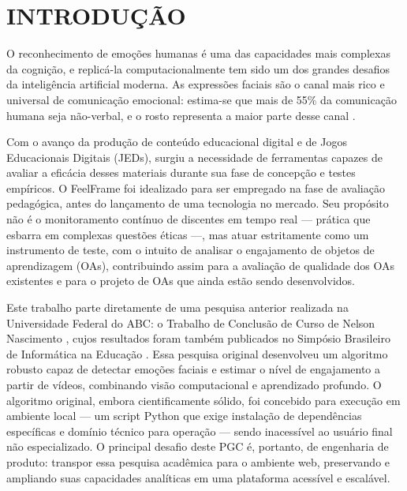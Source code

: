 \documentclass[
	12pt,
	openright,
	oneside,
	a4paper,
	english,
	brazil
	]{abntex2}
\begin{document}
\listoffigures*
\cleardoublepage

\listoftables*
\cleardoublepage

\tableofcontents*
\cleardoublepage

\textual

\chapter{INTRODUÇÃO}

O reconhecimento de emoções humanas é uma das capacidades mais complexas da cognição, e replicá-la computacionalmente tem sido um dos grandes desafios da inteligência artificial moderna. As expressões faciais são o canal mais rico e universal de comunicação emocional: estima-se que mais de 55\% da comunicação humana seja não-verbal, e o rosto representa a maior parte desse canal \cite{mehrabian1971silent}.

Com o avanço da produção de conteúdo educacional digital e de Jogos Educacionais Digitais (JEDs), surgiu a necessidade de ferramentas capazes de avaliar a eficácia desses materiais durante sua fase de concepção e testes empíricos. O FeelFrame foi idealizado para ser empregado na fase de avaliação pedagógica, antes do lançamento de uma tecnologia no mercado. Seu propósito não é o monitoramento contínuo de discentes em tempo real --- prática que esbarra em complexas questões éticas ---, mas atuar estritamente como um instrumento de teste, com o intuito de analisar o engajamento de objetos de aprendizagem (OAs), contribuindo assim para a avaliação de qualidade dos OAs existentes e para o projeto de OAs que ainda estão sendo desenvolvidos.

Este trabalho parte diretamente de uma pesquisa anterior realizada na Universidade Federal do ABC: o Trabalho de Conclusão de Curso de Nelson Nascimento \cite{nascimento2024nelson}, cujos resultados foram também publicados no Simpósio Brasileiro de Informática na Educação \cite{nascimento2024sbie}. Essa pesquisa original desenvolveu um algoritmo robusto capaz de detectar emoções faciais e estimar o nível de engajamento a partir de vídeos, combinando visão computacional e aprendizado profundo. O algoritmo original, embora cientificamente sólido, foi concebido para execução em ambiente local --- um script Python que exige instalação de dependências específicas e domínio técnico para operação --- sendo inacessível ao usuário final não especializado. O principal desafio deste PGC é, portanto, de engenharia de produto: transpor essa pesquisa acadêmica para o ambiente web, preservando e ampliando suas capacidades analíticas em uma plataforma acessível e escalável.
\end{document}
